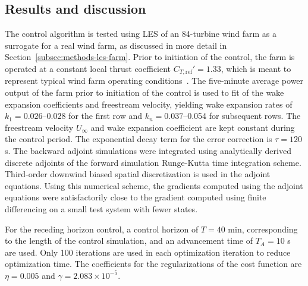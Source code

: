\subsection{Results and discussion}
\label{subsec:rhc-control-results}
The control algorithm is tested using LES of an 84-turbine wind farm as a surrogate for a real wind farm, as discussed in more detail in Section~\ref{subsec:methods-les-farm}. Prior to initiation of the control, the farm is operated at a constant local thrust coefficient $C_{T,\text{ref}}' = 1.33$, which is meant to represent typical wind farm operating conditions~\cite{Calaf2010a}. The five-minute average power output of the farm prior to initiation of the control is used to fit of the wake expansion coefficients and freestream velocity, yielding wake expansion rates of $k_1 = 0.026$--0.028 for the first row and $k_n=0.037$--0.054 for subsequent rows. The freestream velocity $U_\infty$ and wake expansion coefficient are kept constant during the control period. The exponential decay term for the error correction is $\tau = 120$ s. The backward adjoint simulations were integrated using analytically derived discrete adjoints of the forward simulation Runge-Kutta time integration scheme. Third-order downwind biased spatial discretization is used in the adjoint equations. Using this numerical scheme, the gradients computed using the adjoint equations were satisfactorily close to the gradient computed using finite differencing on a small test system with fewer states. 

For the receding horizon control, a control horizon of $T = 40$ min, corresponding to the length of the control simulation, and an advancement time of $T_A = 10$ s are used. Only 100 iterations are used in each optimization iteration to reduce optimization time. The coefficients for the regularizations of the cost function are $\eta = 0.005$ and $\gamma = 2.083\times 10^{-5}$.

